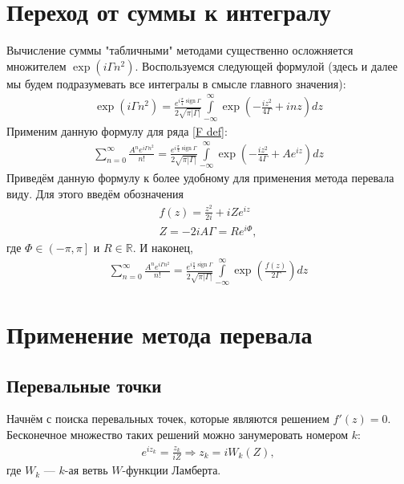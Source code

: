 \documentclass[a4paper, 12pt]{article}
\DeclareMathOperator*{\sign}{sign}
\newenvironment{eqw}{\begin{equation} \begin{aligned}}   
    {\end{aligned}    \end{equation}}
\begin{document}
\section*{Переход от суммы к интегралу}
Вычисление суммы "табличными" методами существенно осложняется множителем $\exp\left(i\Gamma n^2\right)$. Воспользуемся следующей формулой (здесь и далее мы будем подразумевать все интегралы в смысле главного значения):
\begin{eqw}
    \exp\left(i\Gamma n^2\right) = \frac{e^{i\frac{\pi}{4}\sign \Gamma}}{2\sqrt{\pi|\Gamma|}}
    \int\limits_{-\infty}^{\infty} \exp\left(-\frac{i z^2}{4\Gamma} + i n z\right) dz
\end{eqw}
Применим данную формулу для ряда \eqref{F def}:
\begin{eqw}
    \sum\limits_{n=0}^{\infty} \frac{A^n e^{i\Gamma n^2}}{n!} = \frac{e^{i\frac{\pi}{4}\sign \Gamma}}{2\sqrt{\pi|\Gamma|}}
    \int\limits_{-\infty}^{\infty} \exp\left(-\frac{i z^2}{4\Gamma} +  A e^{iz}\right) dz
\end{eqw}
Приведём данную формулу к более удобному для применения метода перевала виду. Для этого введём обозначения
\begin{eqw}
    f(z) =  \frac{z^2}{2i} + i Z e^{iz}\\
    Z = -2i A \Gamma = R e^{i\Phi},
\end{eqw}
где $\Phi\in\left(-\pi, \pi\right]$ и $R\in\mathbb{R}$. И наконец, 
\begin{eqw}\label{row to integral}
    \sum\limits_{n=0}^{\infty} \frac{A^n e^{i\Gamma n^2}}{n!} = \frac{e^{i\frac{\pi}{4}\sign \Gamma}}{2\sqrt{\pi|\Gamma|}}
    \int\limits_{-\infty}^{\infty}\exp\left(\frac{f(z)}{2\Gamma}\right)dz 
\end{eqw}

\section*{Применение метода перевала}
\subsection*{Перевальные точки}
Начнём с поиска перевальных точек, которые являются решением $f'(z)=0$. Бесконечное множество таких решений можно занумеровать номером $k$:
\begin{eqw}
    e^{i z_k} = \frac{z_k}{iZ} \Rightarrow   z_k = i W_k(Z),
\end{eqw}
где $W_k$ --- $k$-ая ветвь $W$-функции Ламберта. 
\end{document}
